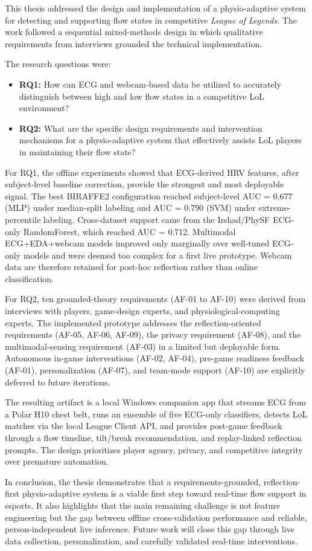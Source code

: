 This thesis addressed the design and implementation of a physio-adaptive system for detecting and supporting flow states in competitive \textit{League of Legends}. The work followed a sequential mixed-methods design in which qualitative requirements from interviews grounded the technical implementation.

The research questions were:

\begin{itemize}
    \item \textbf{RQ1:} How can ECG and webcam-based data be utilized to accurately distinguish between high and low flow states in a competitive LoL environment?
    \item \textbf{RQ2:} What are the specific design requirements and intervention mechanisms for a physio-adaptive system that effectively assists LoL players in maintaining their flow state?
\end{itemize}

For RQ1, the offline experiments showed that ECG-derived HRV features, after subject-level baseline correction, provide the strongest and most deployable signal. The best BIRAFFE2 configuration reached subject-level AUC = 0.677 (MLP) under median-split labeling and AUC = 0.790 (SVM) under extreme-percentile labeling. Cross-dataset support came from the Irshad/PhySF ECG-only RandomForest, which reached AUC = 0.712. Multimodal ECG+EDA+webcam models improved only marginally over well-tuned ECG-only models and were deemed too complex for a first live prototype. Webcam data are therefore retained for post-hoc reflection rather than online classification.

For RQ2, ten grounded-theory requirements (AF-01 to AF-10) were derived from interviews with players, game-design experts, and physiological-computing experts. The implemented prototype addresses the reflection-oriented requirements (AF-05, AF-06, AF-09), the privacy requirement (AF-08), and the multimodal-sensing requirement (AF-03) in a limited but deployable form. Autonomous in-game interventions (AF-02, AF-04), pre-game readiness feedback (AF-01), personalization (AF-07), and team-mode support (AF-10) are explicitly deferred to future iterations.

The resulting artifact is a local Windows companion app that streams ECG from a Polar H10 chest belt, runs an ensemble of five ECG-only classifiers, detects LoL matches via the local League Client API, and provides post-game feedback through a flow timeline, tilt/break recommendation, and replay-linked reflection prompts. The design prioritizes player agency, privacy, and competitive integrity over premature automation.

In conclusion, the thesis demonstrates that a requirements-grounded, reflection-first physio-adaptive system is a viable first step toward real-time flow support in esports. It also highlights that the main remaining challenge is not feature engineering but the gap between offline cross-validation performance and reliable, person-independent live inference. Future work will close this gap through live data collection, personalization, and carefully validated real-time interventions.
